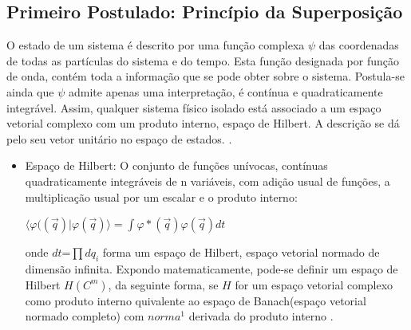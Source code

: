 \documentclass[tcc,capa]{texufpel}
\begin{document}
\subsection{Primeiro Postulado: Princípio da Superposição}

O estado de um sistema é descrito por uma função complexa $\psi$ das coordenadas de todas as partículas do sistema e do tempo. Esta função designada por função de onda, contém toda a informação que se pode obter sobre o sistema. Postula-se ainda que $\psi$ admite apenas uma interpretação, é contínua e quadraticamente integrável.
Assim, qualquer sistema físico isolado está associado a um espaço vetorial complexo com um produto interno, espaço de Hilbert. A descrição se dá pelo seu vetor unitário no espaço de estados. \cite{loss}.
\begin{itemize}
    \item Espaço de Hilbert: O conjunto de funções unívocas, contínuas quadraticamente integráveis de n variáveis, com adição usual de funções, a multiplicação usual por um escalar e o produto interno:
    
\centering    $\langle\varphi((\vec{q})|\varphi(\vec{q})\rangle=\int \varphi * (\vec{q})\varphi(\vec{q})dt $
    
    onde $dt$=$\prod dq_i$ forma um espaço de Hilbert, espaço vetorial normado de dimensão infinita\cite{loss}. 
    Expondo matematicamente, pode-se definir um espaço de Hilbert $H (C^m)$, da seguinte forma, se $H$ for um espaço vetorial complexo como produto interno quivalente ao espaço de Banach(espaço vetorial normado completo) com $norma^1$ derivada do produto interno \cite{biezuner2009notas}.
\end{itemize}
\end{document}
